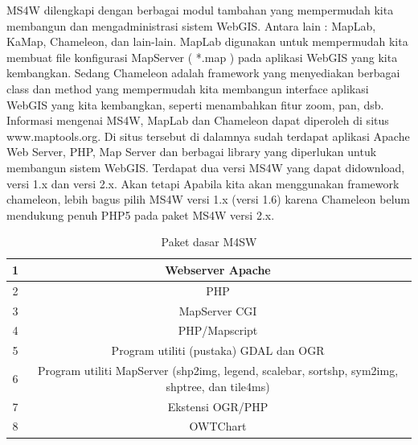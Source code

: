 MS4W dilengkapi dengan berbagai modul tambahan yang mempermudah kita membangun dan mengadministrasi sistem WebGIS. Antara lain : MapLab, KaMap, Chameleon, dan lain-lain. MapLab digunakan untuk mempermudah kita membuat file konfigurasi MapServer ( *.map ) pada aplikasi WebGIS yang kita kembangkan. Sedang Chameleon adalah framework yang menyediakan berbagai class dan method yang mempermudah kita membangun interface aplikasi WebGIS yang kita kembangkan, seperti menambahkan fitur zoom, pan, dsb. Informasi mengenai MS4W, MapLab dan Chameleon dapat diperoleh di situs www.maptools.org. Di situs tersebut di dalamnya sudah terdapat aplikasi Apache Web Server, PHP, Map Server dan berbagai library yang diperlukan untuk membangun sistem WebGIS. Terdapat dua versi MS4W yang dapat didownload, versi 1.x dan versi 2.x. Akan tetapi Apabila kita akan menggunakan framework chameleon, lebih bagus pilih MS4W versi 1.x (versi 1.6) karena Chameleon belum mendukung penuh PHP5 pada paket MS4W versi 2.x.

\begin{table}[h]
\caption{Paket dasar M4SW}
\centering
\begin{tabular}{cc}
\hline
1&Webserver Apache\\
\hline
2&PHP\\
\hline
3&MapServer CGI\\
\hline
4&PHP/Mapscript\\
\hline
5&Program utiliti (pustaka) GDAL dan OGR\\
\hline
6&Program utiliti MapServer (shp2img, legend, scalebar, sortshp, sym2img, shptree, dan tile4ms)\\
\hline
7&Ekstensi OGR/PHP\\
\hline
8&OWTChart\\
\hline
\end{tabular}
\end{table}

